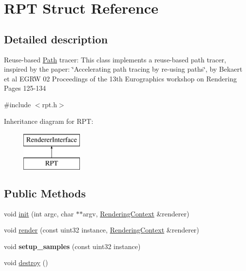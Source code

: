\hypertarget{struct_r_p_t}{}\section{R\+PT Struct Reference}
\label{struct_r_p_t}


\subsection{Detailed description}
Reuse-\/based \hyperlink{struct_path}{Path} tracer\+: This class implements a reuse-\/based path tracer, inspired by the paper\+: \char`\"{}\+Accelerating path tracing by re-\/using paths\char`\"{}, by Bekaert et al E\+G\+RW \textquotesingle{}02 Proceedings of the 13th Eurographics workshop on Rendering Pages 125-\/134 

{\ttfamily \#include $<$rpt.\+h$>$}

Inheritance diagram for R\+PT\+:\begin{figure}[H]
\begin{center}
\leavevmode
\includegraphics[height=2.000000cm]{struct_r_p_t}
\end{center}
\end{figure}
\subsection*{Public Methods}
\begin{DoxyCompactItemize}
\item 
void \hyperlink{struct_r_p_t_ae840ee9e9ef3939729ef0bb653c19f9e}{init} (int argc, char $\ast$$\ast$argv, \hyperlink{struct_rendering_context}{Rendering\+Context} \&renderer)
\item 
void \hyperlink{struct_r_p_t_a03e6ba660d7750e633ec69de179e48e7}{render} (const uint32 instance, \hyperlink{struct_rendering_context}{Rendering\+Context} \&renderer)
\item 
\mbox{\label{struct_r_p_t_a4e37bf30b78ba306b1118e4fc7e2c475}} 
void {\bfseries setup\+\_\+samples} (const uint32 instance)
\item 
void \hyperlink{struct_r_p_t_a201a475612d2fa357ff9fa6d75ad5dfe}{destroy} ()
\end{DoxyCompactItemize}
